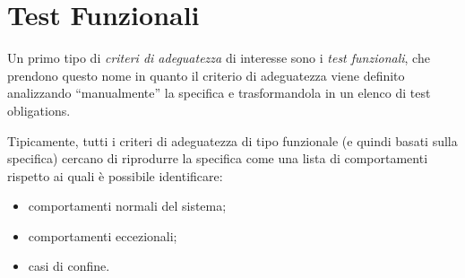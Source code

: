 \newpage
\section{Test Funzionali}

Un primo tipo di \textit{criteri di adeguatezza} di interesse sono i \textit{test funzionali}, che prendono questo nome in quanto il criterio di adeguatezza viene definito analizzando ``manualmente'' la specifica e trasformandola in un elenco di test obligations.

Tipicamente, tutti i criteri di adeguatezza di tipo funzionale (e quindi basati sulla specifica) cercano di riprodurre la specifica come una lista di comportamenti rispetto ai quali è possibile identificare: \begin{itemize}
    \item comportamenti normali del sistema;
    \item comportamenti eccezionali;
    \item casi di confine.
\end{itemize}

